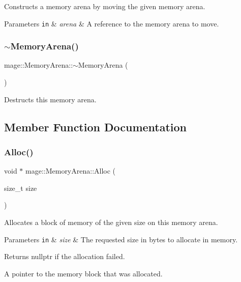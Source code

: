 Constructs a memory arena by moving the given memory arena.


\begin{DoxyParams}[1]{Parameters}
\mbox{\tt in}  & {\em arena} & A reference to the memory arena to move. \\
\hline
\end{DoxyParams}
\mbox{\label{classmage_1_1_memory_arena_acfee6fc205e2eaf6aeef4acf19948e6e}} 
\subsubsection{\texorpdfstring{$\sim$\+Memory\+Arena()}{~MemoryArena()}}
{\footnotesize\ttfamily mage\+::\+Memory\+Arena\+::$\sim$\+Memory\+Arena (\begin{DoxyParamCaption}{ }\end{DoxyParamCaption})}

Destructs this memory arena. 

\subsection{Member Function Documentation}
\mbox{\label{classmage_1_1_memory_arena_a2e63b11c535dbfefd69d071466be9ce1}} 
\subsubsection{\texorpdfstring{Alloc()}{Alloc()}}
{\footnotesize\ttfamily void $\ast$ mage\+::\+Memory\+Arena\+::\+Alloc (\begin{DoxyParamCaption}\item[{size\+\_\+t}]{size }\end{DoxyParamCaption})}

Allocates a block of memory of the given size on this memory arena.


\begin{DoxyParams}[1]{Parameters}
\mbox{\tt in}  & {\em size} & The requested size in bytes to allocate in memory. \\
\hline
\end{DoxyParams}
\begin{DoxyReturn}{Returns}
{\ttfamily nullptr} if the allocation failed. 

A pointer to the memory block that was allocated. 
\end{DoxyReturn}
\mbox{\label{classmage_1_1_memory_arena_a1e83a02b5f5a74ad29d7a2c7f1f539d0}} 
